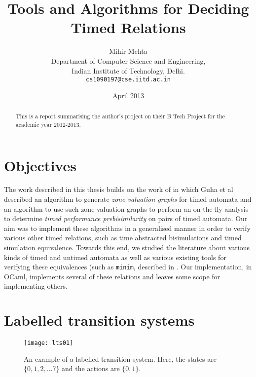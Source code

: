 \documentclass{article}
\begin{document}
\title{Tools and Algorithms for Deciding Timed Relations}

\author{Mihir Mehta\\
  Department of Computer Science and Engineering,\\
  Indian Institute of Technology, Delhi.\\
  \texttt{cs1090197@cse.iitd.ac.in}
}

\date{April 2013}

\maketitle

\begin{abstract}
  This is a report summarising the author's project on their B Tech
  Project for the academic year 2012-2013.
\end{abstract}

\tableofcontents
\pagebreak
\listoffigures
\listoftables
\pagebreak

\section{Objectives}

The work described in this thesis builds on the work of
\cite{DBLP:conf/cav/GuhaNA12} in which Guha et al described an
algorithm to generate \emph{zone valuation graphs} for timed automata
and an algorithm to use such zone-valuation graphs to perform an
on-the-fly analysis to determine \emph{timed performance
  prebisimilarity} on pairs of timed automata. Our aim was to
implement these algorithms in a generalised manner in order to verify
various other timed relations, such as time abstracted bisimulations
\cite{tripakis2001analysis} and timed simulation equivalence. Towards
this end, we studied the literature about various kinds of timed and
untimed automata as well as various existing tools for verifying these
equivalences (such as \texttt{minim}, described in
\cite{tripakis2001analysis}. Our implementation, in OCaml, implements
several of these relations and leaves some scope for implementing others.

\section{Labelled transition systems}

\begin{SCfigure}
  \centering
  \texttt{[image: lts01]}
  \caption{An example of a labelled transition system. Here, the
    states are $\{0, 1, 2, \ldots 7\}$ and the actions are $\{0,
    1\}$.}
  \label{lts01}
\end{SCfigure}
\end{document}
